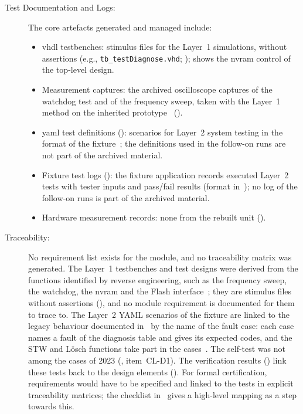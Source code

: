 \begin{description}
	\item[Test Documentation and Logs:] The core artefacts generated and managed include:
	      \begin{itemize}
		      \item \gls{vhdl} testbenches: stimulus files for the Layer~1 simulations, without assertions (e.g., \texttt{tb\_testDiagnose.vhd}; );  shows the \gls{nvram} control of the top-level design.
		      \item Measurement captures: the archived oscilloscope captures of the watchdog test and of the frequency sweep, taken with the Layer~1 method on the inherited prototype~\cite{leyer2023} ().
		      \item \gls{yaml} test definitions (): scenarios for Layer~2 system testing in the format of the fixture~\cite{dolata2023}; the definitions used in the follow-on runs are not part of the archived material.
		      \item Fixture test logs (): the fixture application records executed Layer~2 tests with tester inputs and pass/fail results (format in~); no log of the follow-on runs is part of the archived material.
		      \item Hardware measurement records: none from the rebuilt unit ().
	      \end{itemize}
	\item[Traceability:] No requirement list exists for the module, and no traceability matrix was generated. The Layer~1 testbenches and test designs were derived from the functions identified by reverse engineering, such as the frequency sweep, the watchdog, the \gls{nvram} and the Flash interface~\cite[Sec.~2]{leyer2023}; they are stimulus files without assertions (), and no module requirement is documented for them to trace to. The Layer~2 YAML scenarios of the fixture are linked to the legacy behaviour documented in~\cite{rexroth1992wsp} by the name of the fault case: each case names a fault of the diagnosis table and gives its expected codes, and the STW and Lösch functions take part in the cases~\cite[Sec.~9.3, Listing~3]{dolata2023}. The self-test was not among the cases of 2023 (, item~CL-D1). The verification results () link these tests back to the design elements (). For formal certification, requirements would have to be specified and linked to the tests in explicit traceability matrices; the checklist in~ gives a high-level mapping as a step towards this.

\end{description}
